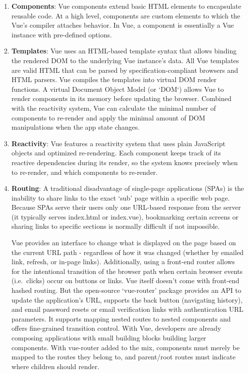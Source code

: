\begin{enumerate}
  \item \textbf{Components}: Vue components extend basic HTML elements to encapsulate reusable code. At a high level, components are custom elements to which the Vue's compiler attaches behavior. In Vue, a component is essentially a Vue instance with pre-defined options.\cite{enwiki:1201106318}
  \item \textbf{Templates}: Vue uses an HTML-based template syntax that allows binding the rendered DOM to the underlying Vue instance's data. All Vue templates are valid HTML that can be parsed by specification-compliant browsers and HTML parsers. Vue compiles the templates into virtual DOM render functions. A virtual Document Object Model (or `DOM`) allows Vue to render components in its memory before updating the browser. Combined with the reactivity system, Vue can calculate the minimal number of components to re-render and apply the minimal amount of DOM manipulations when the app state changes.\cite{enwiki:1201106318}
  \item \textbf{Reactivity}: Vue features a reactivity system that uses plain JavaScript objects and optimized re-rendering. Each component keeps track of its reactive dependencies during its render, so the system knows precisely when to re-render, and which components to re-render.\cite{enwiki:1201106318}
  \item \textbf{Routing}: A traditional disadvantage of single-page applications (SPAs) is the inability to share links to the exact `sub' page within a specific web page. Because SPAs serve their users only one URL-based response from the server (it typically serves index.html or index.vue), bookmarking certain screens or sharing links to specific sections is normally difficult if not impossible.\cite{enwiki:1201106318}

  Vue provides an interface to change what is displayed on the page based on the current URL path - regardless of how it was changed (whether by emailed link, refresh, or in-page links). Additionally, using a front-end router allows for the intentional transition of the browser path when certain browser events (i.e.\ clicks) occur on buttons or links. Vue itself doesn't come with front-end hashed routing. But the open-source `vue-router' package provides an API to update the application's URL, supports the back button (navigating history), and email password resets or email verification links with authentication URL parameters. It supports mapping nested routes to nested components and offers fine-grained transition control. With Vue, developers are already composing applications with small building blocks building larger components. With vue-router added to the mix, components must merely be mapped to the routes they belong to, and parent/root routes must indicate where children should render.\cite{enwiki:1201106318}
\end{enumerate}
